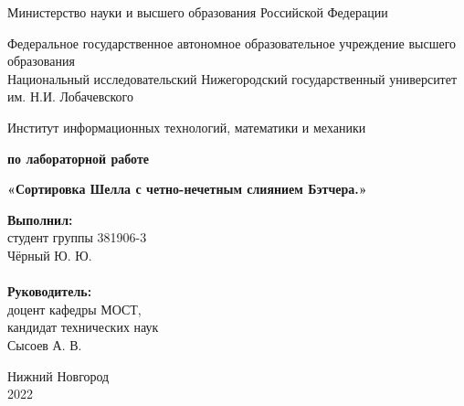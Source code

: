 \documentclass{report}
\begin{document}
\begin{titlepage}

\begin{center}
Министерство науки и высшего образования Российской Федерации
\end{center}

\begin{center}
Федеральное государственное автономное образовательное учреждение высшего образования \\
Национальный исследовательский Нижегородский государственный университет им. Н.И. Лобачевского
\end{center}

\begin{center}
Институт информационных технологий, математики и механики
\end{center}

\vspace{4em}

\begin{center}
\textbf{ по лабораторной работе} \\
\end{center}
\begin{center}
\textbf{\Large«Сортировка Шелла с четно-нечетным слиянием Бэтчера.»} \\
\end{center}

\vspace{4em}

\newbox{\lbox}
\newlength{\maxl}
\setlength{\maxl}{\wd\lbox}
\hfill\parbox{7cm}{
\hspace*{5cm}\hspace*{-5cm}\textbf{Выполнил:} \\ студент группы 381906-3 \\ Чёрный Ю. Ю.\\
\\
\hspace*{5cm}\hspace*{-5cm}\textbf{Руководитель:}\\ доцент кафедры МОСТ, \\ кандидат технических наук \\ Сысоев А. В.\\
}
\vspace{\fill}

\begin{center} Нижний Новгород \\ 2022 \end{center}

\end{titlepage}
\end{document}
